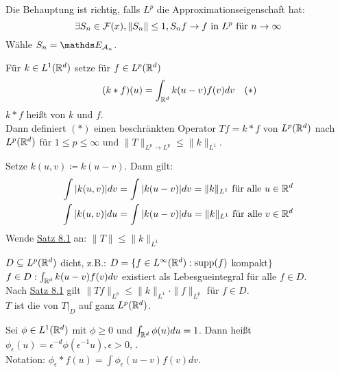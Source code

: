 \begin{beweis}
	Die Behauptung ist richtig, falls $L^{p}$ die Approximationseigenschaft hat:
	\[ \exists S_{n} \in \mathcal{F}(x), \| S_{n} \| \leq 1, S_{n} f \rightarrow f \text{ in } L^{p} \text{ für } n \rightarrow \infty \]
	Wähle $S_{n} = \EW_{\ca_{n}}$.
\end{beweis}


\begin{satz}[Young] \label{satz:8.5-Young} 
	Für $k \in L^{1}(\mathbb{R}^{d})$ setze für $f \in L^{p}(\mathbb{R}^{d})$
	\[ (k \ast f) (u) = \int_{\MdR^{d}} k(u - v) f(v) dv \quad (*) \label{eq:8.5-Young} \]
	$k \ast f$ hei{\ss}t  von $k$ und $f$. \\
	Dann definiert \hyperref[eq:8.5-Young]{$(*)$} einen beschränkten Operator $T f = k \ast f$ von $L^{p}(\mathbb{R}^{d})$ nach $L^{p}(\mathbb{R}^{d})$ für $1 \leq p \leq \infty$ und $\|T\|_{L^{p} \rightarrow L^{p}} \leq \|k\|_{L^{1}}$.
\end{satz}

\begin{beweis}
	Setze $k(u, v) \coloneqq k(u - v)$. Dann gilt:
	\begin{align*}
		\int |k(u, v)| dv & = \int | k(u - v) | dv = \| k \|_{L^{1}} \text{ für alle } u \in \mathbb{R}^{d} \\
			\int |k(u, v)| d u& = \int | k(u - v) | du = \| k \|_{L^{1}} \text{ für alle } v \in \mathbb{R}^{d} \\
	\end{align*}	
	Wende \hyperref[satz:8.1]{Satz 8.1} an: $\| T \| \leq \| k \|_{L^{1}}$
\end{beweis}


\begin{bemerkung*}
	$D \subseteq L^{p}(\mathbb{R}^{d})$ dicht, z.B.: $D = \{ f \in L^{\infty}(\mathbb{R}^{d}): \operatorname{supp}(f)$ kompakt$\}$
	$f \in D: \int_{\mathbb{R}^{d}} k(u - v) f(v) dv$ existiert als Lebesgueintegral für alle $f \in D$. \\
	Nach \hyperref[satz:8.1]{Satz 8.1} gilt $\| T f \|_{L^{p}} \leq \| k \|_{L^{1}} \cdot \| f \|_{L^{p}}$ für $f \in D$. \\
	$T$ ist die  von $T|_{D}$ auf ganz $L^{p}(\mathbb{R}^{d})$.
\end{bemerkung*}


\begin{definition}
	Sei $\phi \in L^{1}(\mathbb{R}^{d})$ mit $\phi \geq 0$ und $\int_{\mathbb{R}^{d}} \phi(u) du = 1$. Dann hei{\ss}t $\phi_{\epsilon}(u) = \epsilon^{-d} \phi(\epsilon^{-1} u), \epsilon > 0$,	. \\
	Notation: $\phi_{\epsilon} \ast f(u) = \int \phi_{\epsilon}(u - v) f(v) dv$.
\end{definition}



